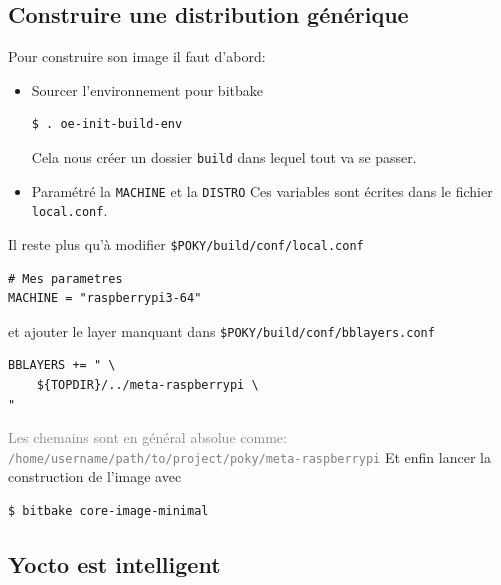 \documentclass[compress]{smilebeamer}
\begin{document}
\subsection{Construire une distribution générique}
\begin{frame}[fragile]
Pour construire son image il faut d'abord:
\begin{itemize}
	\item Sourcer l'environnement pour bitbake
		\begin{lstlisting}[style=shell]
$ . oe-init-build-env
		\end{lstlisting}
		Cela nous créer un dossier \texttt{build} dans lequel tout va se passer.
	\item Paramétré la \texttt{MACHINE} et la \texttt{DISTRO}\newline
		Ces variables sont écrites dans le fichier \texttt{local.conf}.
\end{itemize}
\end{frame}

\begin{frame}[fragile]
Il reste plus qu'à modifier \texttt{\$POKY/build/conf/local.conf}
\begin{lstlisting}[style=bitbake]
# Mes parametres
MACHINE = "raspberrypi3-64"
\end{lstlisting}
et ajouter le layer manquant dans \texttt{\$POKY/build/conf/bblayers.conf}
\begin{lstlisting}[style=bitbake]
BBLAYERS += " \
    ${TOPDIR}/../meta-raspberrypi \
"
\end{lstlisting}
\textcolor{gray}{\tiny{Les chemains sont en général absolue comme: \texttt{/home/username/path/to/project/poky/meta-raspberrypi}}}\newline
Et enfin lancer la construction de l'image avec
\begin{lstlisting}[style=shell]
$ bitbake core-image-minimal
\end{lstlisting}
\end{frame}


\subsection{Yocto est intelligent}
\end{document}
